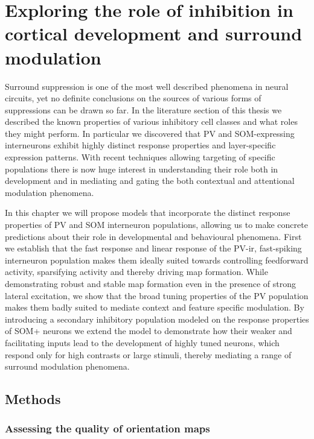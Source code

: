 \chapter{Exploring the role of inhibition in cortical development and surround modulation}

Surround suppression is one of the most well described phenomena in
neural circuits, yet no definite conclusions on the sources of various
forms of suppressions can be drawn so far. In the literature section
of this thesis we described the known properties of various inhibitory
cell classes and what roles they might perform. In particular we
discovered that PV and SOM-expressing interneurons exhibit highly
distinct response properties and layer-specific expression patterns.
With recent techniques allowing targeting of specific populations
there is now huge interest in understanding their role both in
development and in mediating and gating the both contextual and
attentional modulation phenomena.

In this chapter we will propose models that incorporate the distinct
response properties of PV and SOM interneuron populations, allowing us
to make concrete predictions about their role in developmental and
behavioural phenomena. First we establish that the fast response and
linear response of the PV-ir, fast-spiking interneuron population
makes them ideally suited towards controlling feedforward activity,
sparsifying activity and thereby driving map formation. While
demonstrating robust and stable map formation even in the presence of
strong lateral excitation, we show that the broad tuning properties of
the PV population makes them badly suited to mediate context and
feature specific modulation. By introducing a secondary inhibitory
population modeled on the response properties of SOM+ neurons we
extend the model to demonstrate how their weaker and facilitating
inputs \citep{Bartley2008,Beierlein2003,Bartley2008,Tan2008} lead to
the development of highly tuned neurons, which respond only for high
contrasts or large stimuli, thereby mediating a range of surround
modulation phenomena.

\section{Methods}

\subsection{Assessing the quality of orientation maps}

